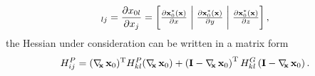 \begin{equation}
[\Dx \vxo]_{lj} =  \frac{\partial x_{0 l}	}{\partial x_j} =  
\begin{bmatrix} \frac{\partial \vxo^*(\vx)}{\partial x} \hspace{1mm} \bigg| & \hspace{-2.5mm}  \frac{\partial \vxo^*(\vx)}{ \partial y} \hspace{1mm} \bigg| & \hspace{-2.5mm} \frac{\partial \vxo^*(\vx)}{ \partial z} 
 \\[.3em] \end{bmatrix},
\end{equation}
the Hessian under consideration can be written in a matrix form
\begin{equation}
\label{eq:app:Hpij}
H_{ij}^P = (\Dx \vxo)^{\mathrm{T}}  H_{kl}^P (\Dx \vxo) + \left( \mathbf{I} - \Dx \vxo \right)^{\mathrm{T}} H^G_{kl} \left( \mathbf{I} - \Dx \vxo \right).
\end{equation}

